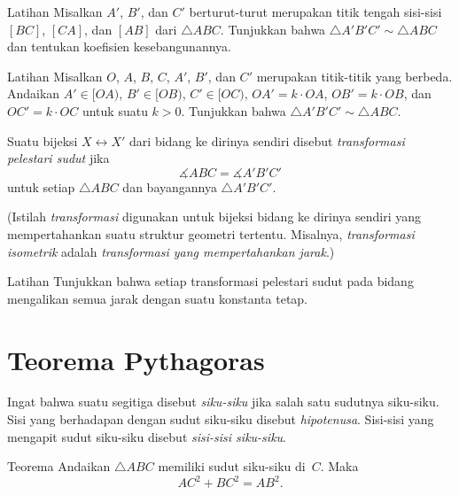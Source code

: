 \begin{thm}{Latihan}\label{ex:mid-triangle}
Misalkan $A'$, $B'$, dan $C'$ berturut-turut merupakan titik tengah sisi-sisi $[BC]$, $[CA]$, dan $[AB]$ dari $\triangle ABC$.
Tunjukkan bahwa $\triangle A'B'C'\sim\triangle ABC$ dan tentukan koefisien kesebangunannya.
\end{thm}

\begin{thm}{Latihan}\label{ex:k*triangle}
Misalkan $O$, $A$, $B$, $C$, $A'$, $B'$, dan $C'$ merupakan titik-titik yang berbeda.
Andaikan $A'\in [OA)$, $B'\in[OB)$, $C'\in [OC)$, $OA'=k\cdot OA$, $OB'=k\cdot OB$, dan $OC'=k\cdot OC$ untuk suatu $k>0$.
Tunjukkan bahwa $\triangle A'B'C'\sim\triangle ABC$.
\end{thm}

Suatu bijeksi $X\leftrightarrow X'$ dari bidang ke dirinya sendiri disebut \emph{transformasi pelestari sudut} jika
\[\measuredangle ABC= \measuredangle A'B'C'\]
untuk setiap $\triangle ABC$ dan bayangannya $\triangle A'B'C'$.

(Istilah \emph{transformasi} digunakan untuk bijeksi bidang ke dirinya sendiri yang mempertahankan suatu struktur geometri tertentu.
Misalnya, {}\emph{transformasi isometrik} adalah \textit{transformasi yang mempertahankan jarak}.)


\begin{thm}{Latihan}\label{ex:angle-preserving-euclid}
Tunjukkan bahwa setiap transformasi pelestari sudut pada bidang mengalikan semua jarak dengan suatu konstanta tetap.
\end{thm}

\section{Teorema Pythagoras}

Ingat bahwa suatu segitiga disebut \emph{siku-siku} jika salah satu sudutnya siku-siku.
Sisi yang berhadapan dengan sudut siku-siku disebut \emph{hipotenusa}.
Sisi-sisi yang mengapit sudut siku-siku disebut \emph{sisi-sisi siku-siku}.


\begin{thm}{Teorema}\label{thm:pyth}
Andaikan $\triangle ABC$ memiliki sudut siku-siku di~$C$.
Maka
$$AC^2+BC^2=AB^2.$$

\end{thm}

